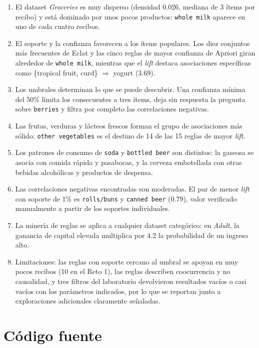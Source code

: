 \documentclass[11pt,a4paper]{article}
\begin{document}
\begin{enumerate}
  \item El dataset \emph{Groceries} es muy disperso (densidad 0.026, mediana de 3 ítems por
        recibo) y está dominado por unos pocos productos: \texttt{whole milk} aparece en uno
        de cada cuatro recibos.
  \item El soporte y la confianza favorecen a los ítems populares. Los diez conjuntos más
        frecuentes de Eclat y las cinco reglas de mayor confianza de Apriori giran alrededor
        de \texttt{whole milk}, mientras que el \emph{lift} destaca asociaciones específicas
        como \{tropical fruit, curd\} $\Rightarrow$ yogurt (3.69).
  \item Los umbrales determinan lo que se puede descubrir. Una confianza mínima del 50\%
        limita los consecuentes a tres ítems, deja sin respuesta la pregunta sobre
        \texttt{berries} y filtra por completo las correlaciones negativas.
  \item Las frutas, verduras y lácteos frescos forman el grupo de asociaciones más sólido:
        \texttt{other vegetables} es el destino de 14 de las 15 reglas de mayor \emph{lift}.
  \item Los patrones de consumo de \texttt{soda} y \texttt{bottled beer} son distintos: la
        gaseosa se asocia con comida rápida y pasabocas, y la cerveza embotellada con otras
        bebidas alcohólicas y productos de despensa.
  \item Las correlaciones negativas encontradas son moderadas. El par de menor \emph{lift}
        con soporte de 1\% es \texttt{rolls/buns} y \texttt{canned beer} (0.79), valor
        verificado manualmente a partir de los soportes individuales.
  \item La minería de reglas se aplica a cualquier dataset categórico: en \emph{Adult}, la
        ganancia de capital elevada multiplica por 4.2 la probabilidad de un ingreso alto.
  \item Limitaciones: las reglas con soporte cercano al umbral se apoyan en muy pocos recibos
        (10 en el Reto 1), las reglas describen coocurrencia y no causalidad, y tres filtros
        del laboratorio devolvieron resultados vacíos o casi vacíos con los parámetros
        indicados, por lo que se reportan junto a exploraciones adicionales claramente
        señaladas.
\end{enumerate}

\appendix
\section{Código fuente}
\end{document}
